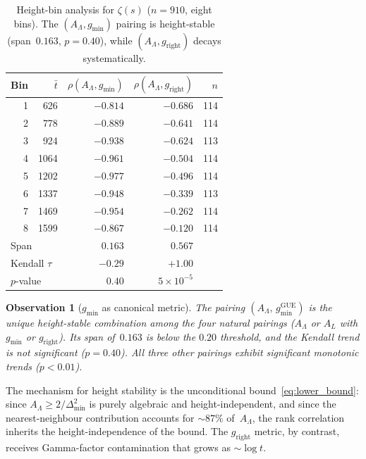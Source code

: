\documentclass[11pt, a4paper]{article}
\theoremstyle{plain}
\newtheorem{observation}[theorem]{Observation}
\theoremstyle{definition}
\newcommand{\Lam}{\Lambda}
\DeclareMathOperator{\GUE}{GUE}
\begin{document}
\begin{table}[h]
\centering
\caption{Height-bin analysis for $\zeta(s)$ ($n = 910$, eight bins).
The $(A_\Lam, g_{\min})$ pairing is height-stable
(span~$0.163$, $p = 0.40$), while
$(A_\Lam, g_{\mathrm{right}})$ decays systematically.}
\label{tab:height_bins}
\small
\begin{tabular}{rrrrr}
\toprule
\textbf{Bin} & $\bar{t}$ &
$\rho(A_\Lam, g_{\min})$ &
$\rho(A_\Lam, g_{\mathrm{right}})$ & $n$ \\
\midrule
1 &  626 & $-0.814$ & $-0.686$ & 114 \\
2 &  778 & $-0.889$ & $-0.641$ & 114 \\
3 &  924 & $-0.938$ & $-0.624$ & 113 \\
4 & 1064 & $-0.961$ & $-0.504$ & 114 \\
5 & 1202 & $-0.977$ & $-0.496$ & 114 \\
6 & 1337 & $-0.948$ & $-0.339$ & 113 \\
7 & 1469 & $-0.954$ & $-0.262$ & 114 \\
8 & 1599 & $-0.867$ & $-0.120$ & 114 \\
\midrule
\multicolumn{2}{l}{Span}         & $0.163$  & $0.567$  & \\
\multicolumn{2}{l}{Kendall $\tau$} & $-0.29$ & $+1.00$  & \\
\multicolumn{2}{l}{$p$-value}    & $0.40$   & $5 \times 10^{-5}$ & \\
\bottomrule
\end{tabular}
\end{table}

\begin{observation}[$g_{\min}$ as canonical metric]
\label{obs:canonical}
The pairing $(A_\Lam,\, g_{\min}^{\GUE})$ is the unique
height-stable combination among the four natural pairings
($A_\Lam$ or $A_L$ with $g_{\min}$ or $g_{\mathrm{right}}$).
Its span of~$0.163$ is below the $0.20$ threshold, and the
Kendall trend is not significant ($p = 0.40$).
All three other pairings exhibit significant monotonic trends
($p < 0.01$).
\end{observation}

The mechanism for height stability is the unconditional
bound~\eqref{eq:lower_bound}: since
$A_\Lam \ge 2/\Delta_{\min}^2$ is purely algebraic and
height-independent, and since the nearest-neighbour contribution
accounts for ${\sim}87\%$ of~$A_\Lam$, the rank correlation
inherits the height-independence of the bound.
The $g_{\mathrm{right}}$ metric, by contrast, receives
Gamma-factor contamination that grows as $\sim \log t$.
\end{document}
